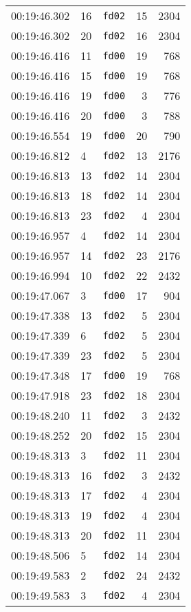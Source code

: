 \documentclass{article}
\begin{document}
\begin{longtable}{lllrr}
00:19:46.302 & 16 & \texttt{fd02} & 15 & 2304 \\
00:19:46.302 & 20 & \texttt{fd02} & 16 & 2304 \\
00:19:46.416 & 11 & \texttt{fd00} & 19 & 768 \\
00:19:46.416 & 15 & \texttt{fd00} & 19 & 768 \\
00:19:46.416 & 19 & \texttt{fd00} & 3 & 776 \\
00:19:46.416 & 20 & \texttt{fd00} & 3 & 788 \\
00:19:46.554 & 19 & \texttt{fd00} & 20 & 790 \\
00:19:46.812 & 4 & \texttt{fd02} & 13 & 2176 \\
00:19:46.813 & 13 & \texttt{fd02} & 14 & 2304 \\
00:19:46.813 & 18 & \texttt{fd02} & 14 & 2304 \\
00:19:46.813 & 23 & \texttt{fd02} & 4 & 2304 \\
00:19:46.957 & 4 & \texttt{fd02} & 14 & 2304 \\
00:19:46.957 & 14 & \texttt{fd02} & 23 & 2176 \\
00:19:46.994 & 10 & \texttt{fd02} & 22 & 2432 \\
00:19:47.067 & 3 & \texttt{fd00} & 17 & 904 \\
00:19:47.338 & 13 & \texttt{fd02} & 5 & 2304 \\
00:19:47.339 & 6 & \texttt{fd02} & 5 & 2304 \\
00:19:47.339 & 23 & \texttt{fd02} & 5 & 2304 \\
00:19:47.348 & 17 & \texttt{fd00} & 19 & 768 \\
00:19:47.918 & 23 & \texttt{fd02} & 18 & 2304 \\
00:19:48.240 & 11 & \texttt{fd02} & 3 & 2432 \\
00:19:48.252 & 20 & \texttt{fd02} & 15 & 2304 \\
00:19:48.313 & 3 & \texttt{fd02} & 11 & 2304 \\
00:19:48.313 & 16 & \texttt{fd02} & 3 & 2432 \\
00:19:48.313 & 17 & \texttt{fd02} & 4 & 2304 \\
00:19:48.313 & 19 & \texttt{fd02} & 4 & 2304 \\
00:19:48.313 & 20 & \texttt{fd02} & 11 & 2304 \\
00:19:48.506 & 5 & \texttt{fd02} & 14 & 2304 \\
00:19:49.583 & 2 & \texttt{fd02} & 24 & 2432 \\
00:19:49.583 & 3 & \texttt{fd02} & 4 & 2304 \\

\end{longtable}
\end{document}
